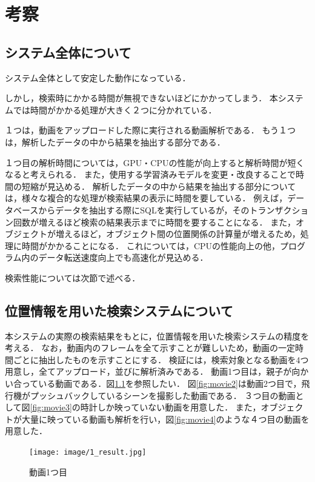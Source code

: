 \documentclass[a4j,12pt,dvipdfmx]{jreport}
\begin{document}
\chapter{考察}
\label{sec:consideration}

\section{システム全体について}
システム全体として安定した動作になっている．

しかし，検索時にかかる時間が無視できないほどにかかってしまう．
本システムでは時間がかかる処理が大きく２つに分かれている．

１つは，動画をアップロードした際に実行される動画解析である．
もう１つは，解析したデータの中から結果を抽出する部分である．

１つ目の解析時間については，GPU・CPUの性能が向上すると解析時間が短くなると考えられる．
また，使用する学習済みモデルを変更・改良することで時間の短縮が見込める．
解析したデータの中から結果を抽出する部分については，様々な複合的な処理が検索結果の表示に時間を要している．
例えば，データベースからデータを抽出する際にSQLを実行しているが，そのトランザクション回数が増えるほど検索の結果表示までに時間を要することになる．
また，オブジェクトが増えるほど，オブジェクト間の位置関係の計算量が増えるため，処理に時間がかかることになる．
これについては，CPUの性能向上の他，プログラム内のデータ転送速度向上でも高速化が見込める．

検索性能については次節で述べる．

\section{位置情報を用いた検索システムについて}
本システムの実際の検索結果をもとに，位置情報を用いた検索システムの精度を考える．
なお，動画内のフレームを全て示すことが難しいため，動画の一定時間ごとに抽出したものを示すことにする．
検証には，検索対象となる動画を4つ用意し，全てアップロード，並びに解析済みである．
動画1つ目は，親子が向かい合っている動画である．図\ref{fig:movie1}を参照したい．
図\ref{fig:movie2}は動画2つ目で，飛行機がプッシュバックしているシーンを撮影した動画である．
３つ目の動画として図\ref{fig:movie3}の時計しか映っていない動画を用意した．
また，オブジェクトが大量に映っている動画も解析を行い，図\ref{fig:movie4}のような４つ目の動画を用意した．

\begin{figure}[H]
  \centering
  \texttt{[image: image/1\_result.jpg]}
  \caption{動画1つ目}
  \label{fig:movie1}
\end{figure}
\end{document}
